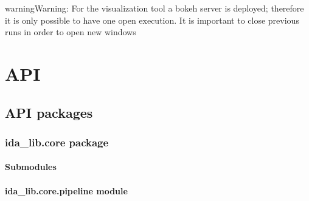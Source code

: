 \documentclass[letterpaper,10pt,english]{sphinxmanual}
\begin{document}
\begin{sphinxadmonition}{warning}{Warning:}
For the visualization tool a bokeh server is deployed; therefore it is only possible to have one open execution.
It is important to close previous runs in order to open new windows
\end{sphinxadmonition}


\section{API}
\label{\detokenize{ida_lib:api}}\label{\detokenize{ida_lib::doc}}

\subsection{API packages}
\label{\detokenize{ida_lib:api-packages}}

\subsubsection{ida\_lib.core package}
\label{\detokenize{ida_lib.core:ida-lib-core-package}}\label{\detokenize{ida_lib.core::doc}}

\paragraph{Submodules}
\label{\detokenize{ida_lib.core:submodules}}

\paragraph{ida\_lib.core.pipeline module}
\label{\detokenize{ida_lib.core:module-ida_lib.core.pipeline}}\label{\detokenize{ida_lib.core:ida-lib-core-pipeline-module}}
\end{document}
